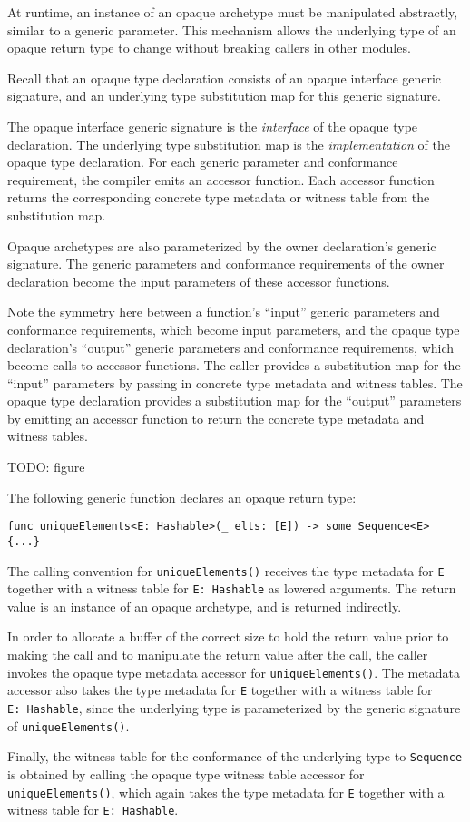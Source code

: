 \documentclass[../generics]{subfiles}
\begin{document}
At runtime, an instance of an opaque archetype must be manipulated abstractly, similar to a generic parameter. This mechanism allows the underlying type of an opaque return type to change without breaking callers in other modules.

Recall that an opaque type declaration consists of an opaque interface generic signature, and an underlying type substitution map for this generic signature.

The opaque interface generic signature is the \emph{interface} of the opaque type declaration. The underlying type substitution map is the \emph{implementation} of the opaque type declaration. For each generic parameter and conformance requirement, the compiler emits an accessor function. Each accessor function returns the corresponding concrete type metadata or witness table from the substitution map.

Opaque archetypes are also parameterized by the owner declaration's generic signature. The generic parameters and conformance requirements of the owner declaration become the input parameters of these accessor functions.

Note the symmetry here between a function's ``input'' generic parameters and conformance requirements, which become input parameters, and the opaque type declaration's ``output'' generic parameters and conformance requirements, which become calls to accessor functions. The caller provides a substitution map for the ``input'' parameters by passing in concrete type metadata and witness tables. The opaque type declaration provides a substitution map for the ``output'' parameters by emitting an accessor function to return the concrete type metadata and witness tables.

TODO: figure

\begin{example}
The following generic function declares an opaque return type:
\begin{Verbatim}
func uniqueElements<E: Hashable>(_ elts: [E]) -> some Sequence<E> {...}
\end{Verbatim}
The calling convention for \texttt{uniqueElements()} receives the type metadata for \texttt{E} together with a witness table for \texttt{E:\ Hashable} as lowered arguments. The return value is an instance of an opaque archetype, and is returned indirectly.

In order to allocate a buffer of the correct size to hold the return value prior to making the call and to manipulate the return value after the call, the caller invokes the opaque type metadata accessor for \texttt{uniqueElements()}. The metadata accessor also takes the type metadata for \texttt{E} together with a witness table for \texttt{E:\ Hashable}, since the underlying type is parameterized by the generic signature of \texttt{uniqueElements()}.

Finally, the witness table for the conformance of the underlying type to \texttt{Sequence} is obtained by calling the opaque type witness table accessor for \texttt{uniqueElements()}, which again takes the type metadata for \texttt{E} together with a witness table for \texttt{E:\ Hashable}.
\end{example}
\end{document}

